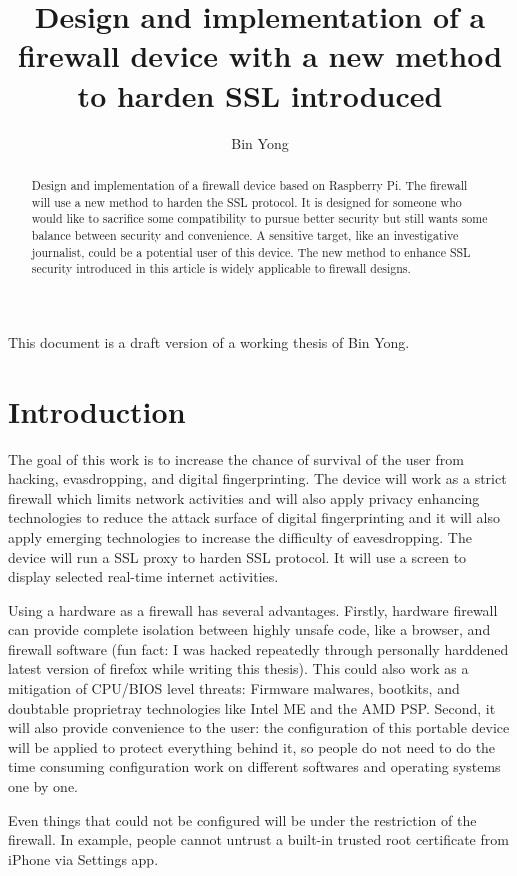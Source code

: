 \documentclass[mscthesis]{usiinfthesis}
\title{Design and implementation of a firewall device with a new method to harden SSL introduced} %
\author{Bin Yong} %
\begin{document}
\maketitle %

\frontmatter %

\begin{abstract}
  Design and implementation of a firewall device based on Raspberry Pi.
  The firewall will use a new method to harden the SSL protocol. It is 
  designed for someone who would like to sacrifice some compatibility 
  to pursue better security but still wants some balance between 
  security and convenience. A sensitive target, like an investigative 
  journalist, could be a potential user of this device. The new method
  to enhance SSL security introduced in this article is widely 
  applicable to firewall designs.

\end{abstract}

\begin{acknowledgements}
  This document is a draft version of a working thesis of Bin Yong.
\end{acknowledgements}

\tableofcontents 
\listoffigures %
\listoftables %

\mainmatter

\chapter{Introduction}
The goal of this work is to increase the chance of survival of the user 
from hacking, evasdropping, and digital fingerprinting. The device will 
work as a strict firewall which limits network activities and will also
apply privacy enhancing technologies to reduce the attack surface of 
digital fingerprinting and it will also apply emerging technologies to 
increase the difficulty of eavesdropping. The device will run a SSL proxy 
to harden SSL protocol. It will use a screen to display selected real-time 
internet activities.\par
Using a hardware as a firewall has several advantages. Firstly, hardware 
firewall can provide complete isolation between highly unsafe code, 
like a browser, and firewall software (fun fact: I was hacked repeatedly 
through personally harddened latest version of firefox while writing this 
thesis). This could also work as a mitigation of CPU/BIOS level threats: 
Firmware malwares, bootkits, and doubtable proprietray technologies like 
Intel ME and the AMD PSP. Second, it will also provide convenience to the 
user: the configuration of this portable device will be applied to protect 
everything behind it, so people do not need to do the time consuming 
configuration work on different softwares and operating systems one by one. \par
Even things that could not be configured will be under the restriction of the firewall. In example, people cannot untrust a built-in trusted root certificate from iPhone via Settings app.
\end{document}
